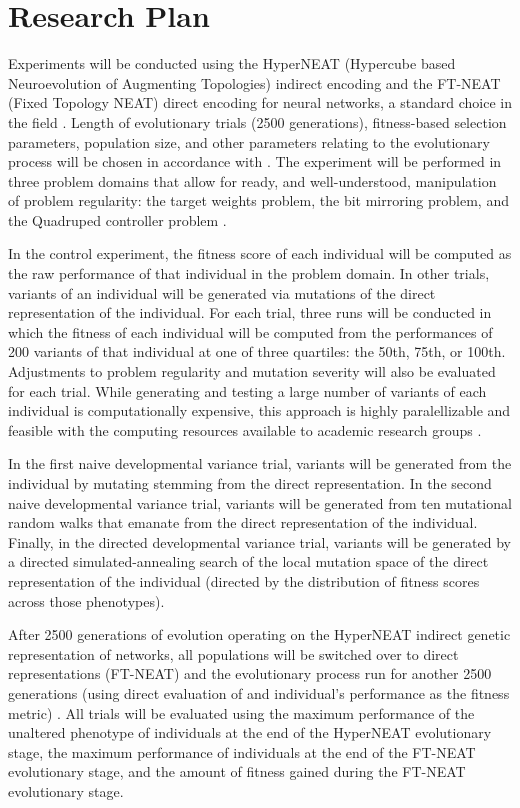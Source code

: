 \section{Research Plan}

Experiments will be conducted using the HyperNEAT (Hypercube based Neuroevolution of Augmenting Topologies) indirect encoding and the FT-NEAT (Fixed Topology NEAT) direct encoding for neural networks, a standard choice in the field \cite{Stanley2009ANetworks,Clune2011OnRegularity}. Length of evolutionary trials (2500 generations), fitness-based selection parameters, population size, and other parameters relating to the evolutionary process will be chosen in accordance with \cite{Clune2011OnRegularity}. The experiment will be performed in three problem domains that allow for ready, and well-understood, manipulation of problem regularity: the target weights problem, the bit mirroring problem, and the Quadruped controller problem \cite{Clune2011OnRegularity}. 

In the control experiment, the fitness score of each individual will be computed as the raw performance of that individual in the problem domain. In other trials, variants of an individual will be generated via mutations of the direct representation of the individual. For each trial, three runs will be conducted in which the fitness of each individual will be computed from the performances of 200 variants of that individual at one of three quartiles: the 50th, 75th, or 100th. Adjustments to problem regularity and mutation severity will also be evaluated for each trial. While generating and testing a large number of variants of each individual is computationally expensive, this approach is highly paralellizable and feasible with the computing resources available to academic research groups \cite{Mengistu2016EvolvabilityIt}.

In the first naive developmental variance trial, variants will be generated from the individual by mutating stemming from the direct representation. In the second naive developmental variance trial, variants will be generated from ten mutational random walks that emanate from the direct representation of the individual. Finally, in the directed developmental variance trial, variants will be generated by a directed simulated-annealing search of the local mutation space of the direct representation of the individual (directed by the distribution of fitness scores across those phenotypes). 

After 2500 generations of evolution operating on the HyperNEAT indirect genetic representation of networks, all populations will be switched over to direct representations (FT-NEAT) and the evolutionary process run for another 2500 generations (using direct evaluation of and individual's performance as the fitness metric) \cite{Clune2011OnRegularity}. All trials will be evaluated using the maximum performance of the unaltered phenotype of individuals at the end of the HyperNEAT evolutionary stage, the maximum performance of individuals at the end of the FT-NEAT evolutionary stage, and the amount of fitness gained during the FT-NEAT evolutionary stage.


